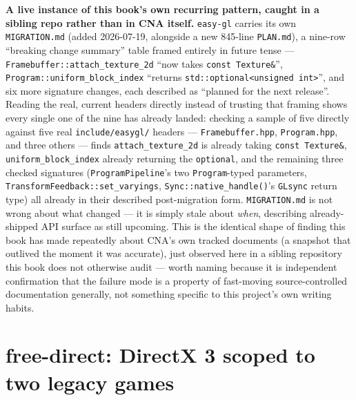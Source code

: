 \begin{sourcenote}
\textbf{A live instance of this book's own recurring pattern, caught in a sibling repo rather
than in CNA itself.} \texttt{easy-gl} carries its own \texttt{MIGRATION.md} (added 2026-07-19,
alongside a new 845-line \texttt{PLAN.md}), a nine-row ``breaking change summary'' table framed
entirely in future tense --- \texttt{Framebuffer::attach\_texture\_2d} ``now takes
\texttt{const~Texture\&}'', \texttt{Program::uniform\_block\_index} ``returns
\texttt{std::optional<unsigned~int>}'', and six more signature changes, each described as
``planned for the next release''. Reading the real, current headers directly instead of
trusting that framing shows every single one of the nine has already landed: checking a sample
of five directly against five real \texttt{include/easygl/} headers ---
\texttt{Framebuffer.hpp}, \texttt{Program.hpp}, and three others --- finds
\texttt{attach\_texture\_2d} is already taking
\texttt{const~Texture\&}, \texttt{uniform\_block\_index} already returning the
\texttt{optional}, and the remaining three checked signatures (\texttt{ProgramPipeline}'s two
\texttt{Program}-typed parameters, \texttt{TransformFeedback::set\_varyings},
\texttt{Sync::native\_handle()}'s \texttt{GLsync} return type) all already in their described
post-migration form. \texttt{MIGRATION.md} is not wrong about what changed --- it is simply
stale about \emph{when}, describing already-shipped API surface as still upcoming. This is the
identical shape of finding this book has made repeatedly about CNA's own tracked documents
(a snapshot that outlived the moment it was accurate), just observed here in a sibling
repository this book does not otherwise audit --- worth naming because it is independent
confirmation that the failure mode is a property of fast-moving source-controlled documentation
generally, not something specific to this project's own writing habits.
\end{sourcenote}

\section{free-direct: DirectX 3 scoped to two legacy games}

